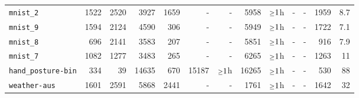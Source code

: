 \begin{tabular}{lrrrrrrrrrrrr}
\texttt{mnist\_2} & 1522 & 2520 & 3927 & 1659 & - & - & 5958 & $\mathsmaller{\geq}1$h & - & - & 1959 & 8.7\\
\texttt{mnist\_9} & 1594 & 2124 & 4590 & 306 & - & - & 5949 & $\mathsmaller{\geq}1$h & - & - & 1722 & 7.1\\
\texttt{mnist\_8} & 696 & 2141 & 3583 & 207 & - & - & 5851 & $\mathsmaller{\geq}1$h & - & - & 916 & 7.9\\
\texttt{mnist\_7} & 1082 & 1277 & 3483 & 265 & - & - & 6265 & $\mathsmaller{\geq}1$h & - & - & 1263 & 11\\
\texttt{hand\_posture-bin} & 334 & 39 & 14635 & 670 & 15187 & $\mathsmaller{\geq}1$h & 16265 & $\mathsmaller{\geq}1$h & - & - & 530 & 88\\
\texttt{weather-aus} & 1601 & 2591 & 5868 & 2441 & - & - & 1761 & $\mathsmaller{\geq}1$h & - & - & 1642 & 32\\
\bottomrule
\end{tabular}
